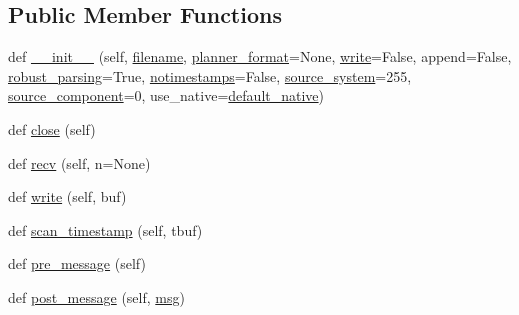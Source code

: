 \subsection*{Public Member Functions}
\begin{DoxyCompactItemize}
\item 
def \mbox{\hyperlink{classpymavlink_1_1mavutil_1_1mavlogfile_a78f80cbf0a415f4bda66ef48d2826e6d}{\+\_\+\+\_\+init\+\_\+\+\_\+}} (self, \mbox{\hyperlink{classpymavlink_1_1mavutil_1_1mavlogfile_a1af91146d60901f4f6f1197693606062}{filename}}, \mbox{\hyperlink{classpymavlink_1_1mavutil_1_1mavlogfile_a68a1a922ff8e2aa75d12820678b40224}{planner\+\_\+format}}=None, \mbox{\hyperlink{classpymavlink_1_1mavutil_1_1mavlogfile_a286beed914444073324880af5f611505}{write}}=False, append=False, \mbox{\hyperlink{classpymavlink_1_1mavutil_1_1mavlogfile_a4022917526709c6bfe69bc66f731532a}{robust\+\_\+parsing}}=True, \mbox{\hyperlink{classpymavlink_1_1mavutil_1_1mavfile_a2743806ba71f58e0dc8a98d76e07f7c9}{notimestamps}}=False, \mbox{\hyperlink{classpymavlink_1_1mavutil_1_1mavfile_a02c06667c79f4414ed9c4ee6a8dec903}{source\+\_\+system}}=255, \mbox{\hyperlink{classpymavlink_1_1mavutil_1_1mavfile_a84e307f771a9ac2aed567831845c417e}{source\+\_\+component}}=0, use\+\_\+native=\mbox{\hyperlink{namespacepymavlink_1_1mavutil_a21ce9da7b698a7bc21c44b9f77341b62}{default\+\_\+native}})
\item 
def \mbox{\hyperlink{classpymavlink_1_1mavutil_1_1mavlogfile_af5763cfaff07bf0270943e98f9a10556}{close}} (self)
\item 
def \mbox{\hyperlink{classpymavlink_1_1mavutil_1_1mavlogfile_a3517f0936b24f1aa60ec3c90b729665e}{recv}} (self, n=None)
\item 
def \mbox{\hyperlink{classpymavlink_1_1mavutil_1_1mavlogfile_a286beed914444073324880af5f611505}{write}} (self, buf)
\item 
def \mbox{\hyperlink{classpymavlink_1_1mavutil_1_1mavlogfile_a53edd3e229ee05b6e9d3401d0d940bfc}{scan\+\_\+timestamp}} (self, tbuf)
\item 
def \mbox{\hyperlink{classpymavlink_1_1mavutil_1_1mavlogfile_ad3bd6ab83073f82be56c6d393e6ea6c3}{pre\+\_\+message}} (self)
\item 
def \mbox{\hyperlink{classpymavlink_1_1mavutil_1_1mavlogfile_ac304637b0b24999e12763ccbc59a2085}{post\+\_\+message}} (self, \mbox{\hyperlink{stratnode_8cpp_a82cfe4ed9bc9e1b07c8bf209c324d85b}{msg}})
\end{DoxyCompactItemize}
